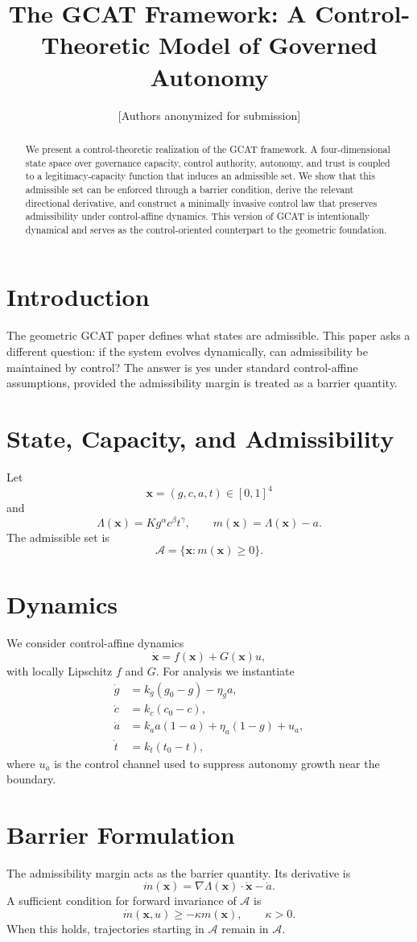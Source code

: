 \documentclass[letterpaper,10pt,conference]{ieeeconf}
\title{\bf The GCAT Framework: A Control-Theoretic Model of Governed Autonomy}
\author{[Authors anonymized for submission]}
\newcommand{\x}{\mathbf{x}}
\newcommand{\A}{\mathcal{A}}
\newcommand{\Lam}{\Lambda}
\begin{document}
\maketitle
\thispagestyle{empty}
\pagestyle{empty}
\begin{abstract}
We present a control-theoretic realization of the GCAT framework. A four-dimensional state space over governance capacity, control authority, autonomy, and trust is coupled to a legitimacy-capacity function that induces an admissible set. We show that this admissible set can be enforced through a barrier condition, derive the relevant directional derivative, and construct a minimally invasive control law that preserves admissibility under control-affine dynamics. This version of GCAT is intentionally dynamical and serves as the control-oriented counterpart to the geometric foundation.
\end{abstract}
\section{Introduction}
The geometric GCAT paper defines what states are admissible. This paper asks a different question: if the system evolves dynamically, can admissibility be maintained by control? The answer is yes under standard control-affine assumptions, provided the admissibility margin is treated as a barrier quantity.
\section{State, Capacity, and Admissibility}
Let
\[
\x=(g,c,a,t)\in[0,1]^4
\]
and
\[
\Lam(\x)=K g^\alpha c^\beta t^\gamma,
\qquad
m(\x)=\Lam(\x)-a.
\]
The admissible set is
\[
\A=\{\x:m(\x)\ge 0\}.
\]
\section{Dynamics}
We consider control-affine dynamics
\[
\dot{\x}=f(\x)+G(\x)u,
\]
with locally Lipschitz $f$ and $G$. For analysis we instantiate
\begin{align}
\dot g &= k_g(g_0-g)-\eta_g a,\\
\dot c &= k_c(c_0-c),\\
\dot a &= k_a a(1-a)+\eta_a(1-g)+u_a,\\
\dot t &= k_t(t_0-t),
\end{align}
where $u_a$ is the control channel used to suppress autonomy growth near the boundary.
\section{Barrier Formulation}
The admissibility margin acts as the barrier quantity. Its derivative is
\[
\dot m(\x)=\nabla \Lam(\x)\cdot \dot{\x}-\dot a.
\]
A sufficient condition for forward invariance of $\A$ is
\[
\dot m(\x,u)\ge -\kappa m(\x),\qquad \kappa>0.
\]
When this holds, trajectories starting in $\A$ remain in $\A$.
\end{document}
